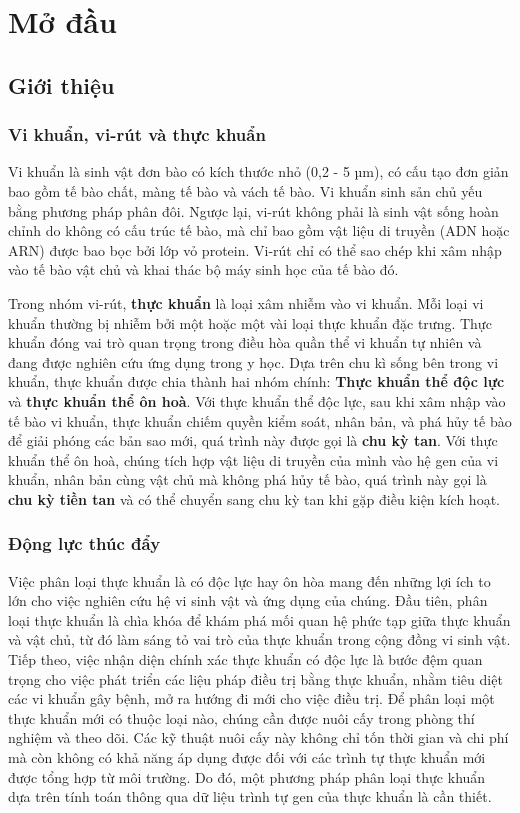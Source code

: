\chapter{Mở đầu}
\setcounter{page}{1}
\section{Giới thiệu}

\subsection{Vi khuẩn, vi-rút và thực khuẩn}

Vi khuẩn là sinh vật đơn bào có kích thước nhỏ (0,2 - 5 µm), có cấu tạo đơn giản bao gồm tế bào chất, màng tế bào và vách tế bào. Vi khuẩn sinh sản chủ yếu bằng phương pháp phân đôi. Ngược lại, vi-rút không phải là sinh vật sống hoàn chỉnh do không có cấu trúc tế bào, mà chỉ bao gồm vật liệu di truyền (ADN hoặc ARN) được bao bọc bởi lớp vỏ protein. Vi-rút chỉ có thể sao chép khi xâm nhập vào tế bào vật chủ và khai thác bộ máy sinh học của tế bào đó.

Trong nhóm vi-rút, \textbf{thực khuẩn} là loại xâm nhiễm vào vi khuẩn. Mỗi loại vi khuẩn thường bị nhiễm bởi một hoặc một vài loại thực khuẩn đặc trưng. Thực khuẩn đóng vai trò quan trọng trong điều hòa quần thể vi khuẩn tự nhiên và đang được nghiên cứu ứng dụng trong y học. Dựa trên chu kì sống bên trong vi khuẩn, thực khuẩn được chia thành hai nhóm chính: \textbf{Thực khuẩn thể độc lực} và \textbf{thực khuẩn thể ôn hoà}. Với thực khuẩn thể độc lực, sau khi xâm nhập vào tế bào vi khuẩn, thực khuẩn chiếm quyền kiểm soát, nhân bản, và phá hủy tế bào để giải phóng các bản sao mới, quá trình này được gọi là \textbf{chu kỳ tan}. Với thực khuẩn thể ôn hoà, chúng tích hợp vật liệu di truyền của mình vào hệ gen của vi khuẩn, nhân bản cùng vật chủ mà không phá hủy tế bào, quá trình này gọi là \textbf{chu kỳ tiền tan} và có thể chuyển sang chu kỳ tan khi gặp điều kiện kích hoạt.


\subsection{Động lực thúc đẩy}

Việc phân loại thực khuẩn là có độc lực hay ôn hòa mang đến những lợi ích to lớn cho việc nghiên cứu hệ vi sinh vật và ứng dụng của chúng. Đầu tiên, phân loại thực khuẩn là chìa khóa để khám phá mối quan hệ phức tạp giữa thực khuẩn và vật chủ, từ đó làm sáng tỏ vai trò của thực khuẩn trong cộng đồng vi sinh vật. Tiếp theo, việc nhận diện chính xác thực khuẩn có độc lực là bước đệm quan trọng cho việc phát triển các liệu pháp điều trị bằng thực khuẩn, nhằm tiêu diệt các vi khuẩn gây bệnh, mở ra hướng đi mới cho việc điều trị.
Để phân loại một thực khuẩn mới có thuộc loại nào, chúng cần được nuôi cấy trong phòng thí nghiệm và theo dõi. Các kỹ thuật nuôi cấy này không chỉ tốn thời gian và chi phí mà còn không có khả năng áp dụng được đối với các trình tự thực khuẩn mới được tổng hợp từ môi trường. Do đó, một phương pháp phân loại thực khuẩn dựa trên tính toán thông qua dữ liệu trình tự gen của thực khuẩn là cần thiết.

